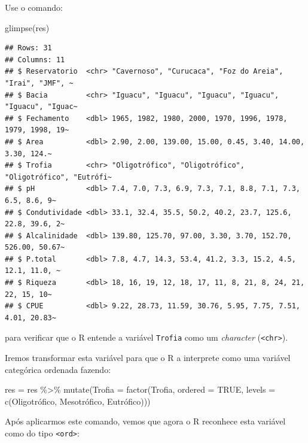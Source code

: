 \documentclass[
]{book}
\newenvironment{Shaded}{\begin{snugshade}}{\end{snugshade}}
\newcommand{\AttributeTok}[1]{\textcolor[rgb]{0.77,0.63,0.00}{#1}}
\newcommand{\ConstantTok}[1]{\textcolor[rgb]{0.00,0.00,0.00}{#1}}
\newcommand{\FunctionTok}[1]{\textcolor[rgb]{0.00,0.00,0.00}{#1}}
\newcommand{\NormalTok}[1]{#1}
\newcommand{\OtherTok}[1]{\textcolor[rgb]{0.56,0.35,0.01}{#1}}
\newcommand{\SpecialCharTok}[1]{\textcolor[rgb]{0.00,0.00,0.00}{#1}}
\newcommand{\StringTok}[1]{\textcolor[rgb]{0.31,0.60,0.02}{#1}}
\begin{document}
Use o comando:

\begin{Shaded}
\begin{Highlighting}[]
\FunctionTok{glimpse}\NormalTok{(res)}
\end{Highlighting}
\end{Shaded}

\begin{verbatim}
## Rows: 31
## Columns: 11
## $ Reservatorio  <chr> "Cavernoso", "Curucaca", "Foz do Areia", "Irai", "JMF", ~
## $ Bacia         <chr> "Iguacu", "Iguacu", "Iguacu", "Iguacu", "Iguacu", "Iguac~
## $ Fechamento    <dbl> 1965, 1982, 1980, 2000, 1970, 1996, 1978, 1979, 1998, 19~
## $ Area          <dbl> 2.90, 2.00, 139.00, 15.00, 0.45, 3.40, 14.00, 3.30, 124.~
## $ Trofia        <chr> "Oligotrófico", "Oligotrófico", "Oligotrófico", "Eutrófi~
## $ pH            <dbl> 7.4, 7.0, 7.3, 6.9, 7.3, 7.1, 8.8, 7.1, 7.3, 6.5, 8.6, 9~
## $ Condutividade <dbl> 33.1, 32.4, 35.5, 50.2, 40.2, 23.7, 125.6, 22.8, 39.6, 2~
## $ Alcalinidade  <dbl> 139.80, 125.70, 97.00, 3.30, 3.70, 152.70, 526.00, 50.67~
## $ P.total       <dbl> 7.8, 4.7, 14.3, 53.4, 41.2, 3.3, 15.2, 4.5, 12.1, 11.0, ~
## $ Riqueza       <dbl> 18, 16, 19, 12, 18, 17, 11, 8, 21, 8, 24, 21, 22, 15, 10~
## $ CPUE          <dbl> 9.22, 28.73, 11.59, 30.76, 5.95, 7.75, 7.51, 4.01, 20.83~
\end{verbatim}

para verificar que o R entende a variável \texttt{Trofia} como um \emph{character} (\texttt{\textless{}chr\textgreater{}}).

Iremos transformar esta variável para que o R a interprete como uma variável categórica ordenada fazendo:

\begin{Shaded}
\begin{Highlighting}[]
\NormalTok{res }\OtherTok{=}\NormalTok{ res }\SpecialCharTok{\%\textgreater{}\%} 
  \FunctionTok{mutate}\NormalTok{(}\AttributeTok{Trofia =} \FunctionTok{factor}\NormalTok{(Trofia, }\AttributeTok{ordered =} \ConstantTok{TRUE}\NormalTok{, }
                         \AttributeTok{levels =} \FunctionTok{c}\NormalTok{(}\StringTok{\textquotesingle{}Oligotrófico\textquotesingle{}}\NormalTok{, }\StringTok{\textquotesingle{}Mesotrófico\textquotesingle{}}\NormalTok{, }\StringTok{\textquotesingle{}Eutrófico\textquotesingle{}}\NormalTok{)))}
\end{Highlighting}
\end{Shaded}

Após aplicarmos este comando, vemos que agora o R reconhece esta variável como do tipo \texttt{\textless{}ord\textgreater{}}:
\end{document}

